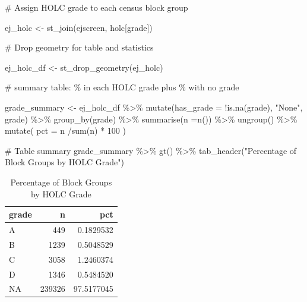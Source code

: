 \documentclass[
  letterpaper,
  DIV=11,
  numbers=noendperiod]{scrartcl}
\newenvironment{Shaded}{\begin{snugshade}}{\end{snugshade}}
\newcommand{\AttributeTok}[1]{\textcolor[rgb]{0.40,0.45,0.13}{#1}}
\newcommand{\CommentTok}[1]{\textcolor[rgb]{0.37,0.37,0.37}{#1}}
\newcommand{\DecValTok}[1]{\textcolor[rgb]{0.68,0.00,0.00}{#1}}
\newcommand{\FunctionTok}[1]{\textcolor[rgb]{0.28,0.35,0.67}{#1}}
\newcommand{\NormalTok}[1]{\textcolor[rgb]{0.00,0.23,0.31}{#1}}
\newcommand{\OtherTok}[1]{\textcolor[rgb]{0.00,0.23,0.31}{#1}}
\newcommand{\SpecialCharTok}[1]{\textcolor[rgb]{0.37,0.37,0.37}{#1}}
\newcommand{\StringTok}[1]{\textcolor[rgb]{0.13,0.47,0.30}{#1}}
\begin{document}
\begin{Shaded}
\begin{Highlighting}[]
\CommentTok{\# Assign HOLC grade to each census block group}

\NormalTok{ej\_holc }\OtherTok{\textless{}{-}} \FunctionTok{st\_join}\NormalTok{(ejscreen, holc[}\StringTok{\textquotesingle{}grade\textquotesingle{}}\NormalTok{])}

\CommentTok{\# Drop geometry for table and statistics}

\NormalTok{ej\_holc\_df }\OtherTok{\textless{}{-}} \FunctionTok{st\_drop\_geometry}\NormalTok{(ej\_holc)}

\CommentTok{\# summary table: \% in each HOLC grade plus \% with no grade}

\NormalTok{grade\_summary }\OtherTok{\textless{}{-}}\NormalTok{ ej\_holc\_df }\SpecialCharTok{\%\textgreater{}\%} 
  \FunctionTok{mutate}\NormalTok{(}\AttributeTok{has\_grade =} \SpecialCharTok{!}\FunctionTok{is.na}\NormalTok{(grade), }\StringTok{"None"}\NormalTok{, grade) }\SpecialCharTok{\%\textgreater{}\%} 
  \FunctionTok{group\_by}\NormalTok{(grade) }\SpecialCharTok{\%\textgreater{}\%} 
  \FunctionTok{summarise}\NormalTok{(}\AttributeTok{n =}\FunctionTok{n}\NormalTok{()) }\SpecialCharTok{\%\textgreater{}\%} 
  \FunctionTok{ungroup}\NormalTok{() }\SpecialCharTok{\%\textgreater{}\%} 
  \FunctionTok{mutate}\NormalTok{(}
    \AttributeTok{pct =}\NormalTok{ n }\SpecialCharTok{/}\FunctionTok{sum}\NormalTok{(n) }\SpecialCharTok{*} \DecValTok{100}
\NormalTok{  )}

\CommentTok{\# Table summary}
\NormalTok{grade\_summary }\SpecialCharTok{\%\textgreater{}\%}  \FunctionTok{gt}\NormalTok{() }\SpecialCharTok{\%\textgreater{}\%}  \FunctionTok{tab\_header}\NormalTok{(}\StringTok{"Percentage of Block Groups by HOLC Grade"}\NormalTok{)}
\end{Highlighting}
\end{Shaded}

\begin{table}
\caption*{
{\fontsize{20}{25}\selectfont  Percentage of Block Groups by HOLC Grade\fontsize{12}{15}\selectfont }
} 
\fontsize{12.0pt}{14.0pt}\selectfont
\begin{tabular*}{\linewidth}{@{\extracolsep{\fill}}lrr}
\toprule
grade & n & pct \\ 
\midrule\addlinespace[2.5pt]
A & 449 & 0.1829532 \\ 
B & 1239 & 0.5048529 \\ 
C & 3058 & 1.2460374 \\ 
D & 1346 & 0.5484520 \\ 
NA & 239326 & 97.5177045 \\ 
\bottomrule
\end{tabular*}
\end{table}
\end{document}
